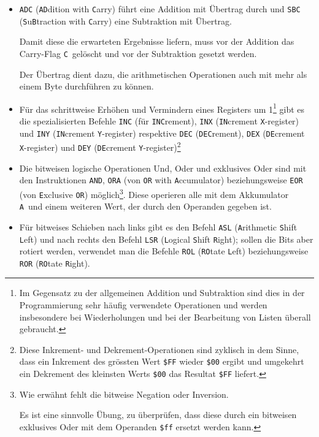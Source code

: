 \documentclass[11pt]{scrartcl}
\newcommand{\acc}{\texttt{A}}
\newcommand{\cflag}{\texttt{C}}
\newcommand{\hex}[1]{\texttt{\$#1}}
\begin{document}
\begin{itemize}
\item \lstinline|ADC| (\texttt{AD}dition with \texttt{C}arry) führt
  eine Addition mit Übertrag durch und \lstinline!SBC!
  (\texttt{S}u\texttt{B}traction with \texttt{C}arry) eine Subtraktion
  mit Übertrag.
  
  Damit diese die erwarteten Ergebnisse liefern, muss vor der Addition das
  Carry-Flag \cflag\ gelöscht und vor der Subtraktion gesetzt
  werden. 
  
  Der Übertrag dient dazu, die arithmetischen Operationen auch mit
  mehr als einem Byte durchführen zu können.
\item Für das schrittweise Erhöhen und Vermindern eines Registers um
  1\footnote{Im Gegensatz zu der allgemeinen Addition und Subtraktion
    sind dies in der Programmierung sehr häufig verwendete
    Operationen und werden insbesondere bei Wiederholungen und bei der
    Bearbeitung von Listen überall gebraucht.} gibt es die
  spezialisierten Befehle \lstinline|INC| (für \texttt{INC}rement),
  \lstinline|INX| (\texttt{IN}crement \texttt{X}-register) und
  \lstinline|INY| (\texttt{IN}crement \texttt{Y}-register) respektive
  \lstinline|DEC| (\texttt{DEC}rement),
  \lstinline|DEX| (\texttt{DE}crement \texttt{X}-register) und
  \lstinline|DEY| (\texttt{DE}crement \texttt{Y}-register)\footnote{Diese
    Inkrement- und Dekrement-Operationen sind zyklisch in dem Sinne,
    dass ein Inkrement des grössten Wert \hex{FF} wieder \hex{00}
    ergibt und umgekehrt ein Dekrement des kleinsten Werts \hex{00}
    das Resultat \hex{FF} liefert.}
\item Die bitweisen logische Operationen Und, Oder und exklusives Oder
  sind mit den Instruktionen \lstinline|AND|, \lstinline|ORA| (von
  \texttt{OR} with \texttt{A}ccumulator) 
  beziehungsweise \lstinline|EOR| (von \texttt{E}xclusive \texttt{OR})
  möglich\footnote{Wie erwähnt fehlt
    die bitweise Negation oder Inversion.

    Es ist eine sinnvolle Übung, zu überprüfen, dass diese durch ein
    bitweisen exklusives Oder mit dem Operanden \hex{ff} ersetzt
    werden kann.}. Diese operieren alle mit dem Akkumulator \acc\ und
  einem weiteren Wert, der durch den Operanden gegeben ist.
\item Für bitweises Schieben nach links gibt es den Befehl
  \lstinline|ASL| (\texttt{A}rithmetic \texttt{S}hift \texttt{L}eft)
  und nach rechts den Befehl \lstinline|LSR| (\texttt{L}ogical
  \texttt{S}hift \texttt{R}ight); 
  sollen die Bits aber rotiert werden, verwendet man die Befehle
  \lstinline|ROL| (\texttt{RO}tate \texttt{L}eft) beziehungsweise
  \lstinline|ROR| (\texttt{RO}tate \texttt{R}ight).
\end{itemize}
\end{document}
